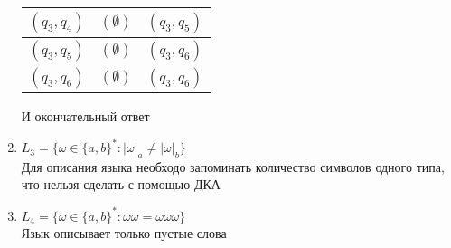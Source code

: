 \documentclass{article}
\begin{document}
\begin{enumerate}
\begin{center}
\begin{tabular} {|c|c|c|}
            \hline
            \((q_3,q_4)\) & $(\emptyset)$ & \((q_3,q_5)\) \\
            \hline
            \((q_3,q_5)\) & $(\emptyset)$ & \((q_3,q_6)\) \\
            \hline
            \((q_3,q_6)\) & $(\emptyset)$ & \((q_3,q_6)\) \\
            \hline
        \end{tabular}
    \end{center}
    И окончательный ответ
    \begin{center}
            \begin{figure}[htbp]
                \centering
                
            \end{figure}
        \end{center}
    \item \(L_3=\{\omega\in\{a,b\}^*:|\omega|_a \neq |\omega|_b \}\) \\
    Для описания языка необходо запоминать количество символов одного типа, что нельзя сделать с помощью ДКА
    \item \(L_4=\{\omega\in\{a,b\}^* : \omega \omega = \omega \omega \omega \} \) \\
    Язык описывает только пустые слова
    \begin{center}
        \begin{figure}[htbp]
            \centering
            
        \end{figure}
    \end{center}
    \end{enumerate}
\end{document}
